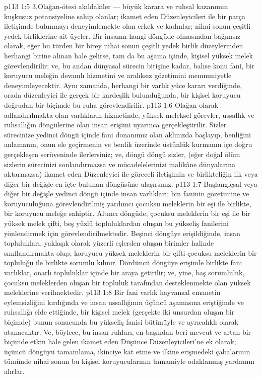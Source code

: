 \vs p113 1:5 3.\bibnobreakspace Olağan\hyp{}ötesi akıldakiler --- büyük karara ve ruhsal kazanımın kuşkusuz potansiyeline sahip olanlar; ikamet eden Düzenleyicileri ile bir parça iletişimde bulunmayı deneyimlemekte olan erkek ve kadınlar; nihai sonun çeşitli yedek birliklerine ait üyeler. Bir insanın hangi döngüde olmasından bağımsız olarak, eğer bu türden bir birey nihai sonun çeşitli yedek birlik düzeylerinden herhangi birine alınan hale gelirse, tam da bu aşama içinde, kişisel yüksek melek görevlendirilir; ve, bu andan dünyasal sürecin bitişine kadar, bahse konu fani, bir koruyucu meleğin devamlı hizmetini ve aralıksız gözetimini memnuniyetle deneyimleyecektir. Aynı zamanda, herhangi bir varlık  yüce kararı verdiğinde, orada düzenleyici ile gerçek bir kardeşlik bulunduğunda, bir kişisel koruyucu doğrudan bir biçimde bu ruha görevlendirilir.
\vs p113 1:6 Olağan olarak adlandırılmakta olan varlıkların hizmetinde, yüksek meleksel görevler, ussallık ve ruhsallığın döngülerine olan insan erişimi uyarınca gerçekleştirilir. Sizler sürecinize yedinci döngü içinde fani donanımız olan aklınızda başlayıp, benliğini anlamanın, onun ele geçirmenin ve benlik üzerinde üstünlük kurmanın içe doğru gerçekleşen serüveninde ilerlersiniz; ve, döngü döngü sizler, (eğer doğal ölüm sizlerin sürecinizi sonlandırmazsa ve mücadelelerinizi malikâne dünyalarına aktarmazsa) ikamet eden Düzenleyici ile göreceli iletişimin ve birlikteliğin ilk veya diğer bir değişle en içte bulunan döngüsüne ulaşırsınız.
\vs p113 1:7 Başlangıçsal veya diğer bir değişle yedinci döngü içinde insan varlıkları; bin faninin gözetimine ve koruyuculuğuna görevlendirilmiş yardımcı çocuksu meleklerin bir eşi ile birlikte, bir koruyucu meleğe sahiptir. Altıncı döngüde, çocuksu meleklerin bir eşi ile bir yüksek melek çifti, beş yüzlü topluluklardan oluşan bu yükseliş fanilerini yönlendirmek için görevlendirilmektedir. Beşinci döngüye erişildiğinde, insan toplulukları, yaklaşık olarak yüzerli eşlerden oluşan birimler halinde sınıflandırmakta olup, koruyucu yüksek meleklerin bir çifti çocuksu meleklerin bir topluluğu ile birlikte sorumlu kılınır. Dördüncü döngüye erişimle birlikte fani varlıklar, onarlı topluluklar içinde bir araya getirilir; ve, yine, baş sorumluluk, çocuksu meleklerden oluşan bir topluluk tarafından desteklenmekte olan yüksek meleklerine verilmektedir.
\vs p113 1:8 Bir fani varlık hayvansal emanetin eylemsizliğini kırdığında ve insan ussallığının üçüncü aşamasına eriştiğinde ve ruhsallığı elde ettiğinde, bir kişisel melek (gerçekte iki unsurdan oluşan bir biçimde) bunun sonucunda bu yükseliş fanisi bütünüyle ve ayrıcalıklı olarak atanacaktır. Ve, böylece, bu insan ruhları, en başından beri mevcut ve artan bir biçimde etkin hale gelen ikamet eden Düşünce Düzenleyicileri’ne ek olarak; üçüncü döngüyü tamamlama, ikinciye kat etme ve ilkine erişmedeki çabalarının tümünde nihai sonun bu kişisel koruyucularının tamamiyle odaklanmış yardımını alırlar.
